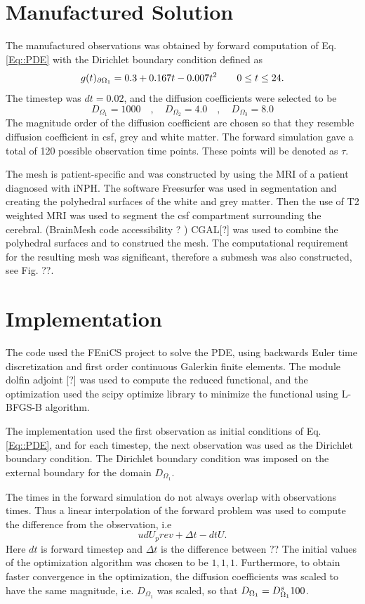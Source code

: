 \documentclass[11pt,a4paper]{article}
\begin{document}
\section*{Manufactured Solution}
The manufactured observations was obtained by forward computation of Eq.\ref{Eq::PDE} with the Dirichlet boundary condition defined as
\begin{equation}
g(t)_{\partial \Omega_1} = 0.3 +0.167t - 0.007t\sp{2} \qquad  0 \leq t \leq 24.
\label{EQ::DIRI}
\end{equation}
The timestep was $dt = 0.02$, and the diffusion coefficients were selected to be 
\begin{equation}
D_{\Omega_1} = 1000 \quad , \quad D_{\Omega_2} = 4.0 \quad , \quad D_{\Omega_3} = 8.0 
\end{equation}  
The magnitude order of the diffusion coefficient are chosen so that they resemble diffusion coefficient in csf, grey and white matter. The forward simulation gave a total of 120 possible observation time points. These points 
will be denoted as $\tau$.

The mesh is patient-specific and was constructed by using the MRI of a patient diagnosed with iNPH. The software Freesurfer was used in segmentation and creating the polyhedral surfaces of the white and grey matter. Then the use of T2 weighted MRI was used to segment the csf compartment surrounding the cerebral. (BrainMesh code accessibility ? ) CGAL[?] was used to combine the polyhedral surfaces and to construed the mesh. The computational requirement for the resulting mesh was significant, therefore a submesh was also constructed, see Fig. ??. 


\section*{Implementation}
The code used the FEniCS project to solve the PDE, using backwards Euler time discretization and first order continuous Galerkin finite elements. The module dolfin adjoint [?] was used to compute the reduced functional, and the optimization used the scipy optimize library to minimize the functional using L-BFGS-B algorithm.   

The implementation used the first observation as initial conditions of Eq.\ref{Eq::PDE}, and for each timestep, the next observation was used as the Dirichlet boundary condition. The Dirichlet boundary condition was imposed on the external boundary for the domain $D_{\Omega_1}$. 


The times in the forward simulation do not always overlap with observations times. Thus a linear interpolation of the forward problem was used to compute the difference from the observation, i.e 
\begin{equation}
u        d U_prev + \Delta t - dt U.
\end{equation}
Here $dt$ is forward timestep and $\Delta t$ is the difference between ?? 
The initial values of the optimization algorithm was chosen to be $1,1,1$. Furthermore, to obtain faster convergence in the optimization, the diffusion coefficients was scaled to have the same magnitude, i.e.  $D_{\Omega_1}$ was scaled, so that $D_{\Omega_1} = D\sp {s}_{\Omega_1}100$.     
\end{document}
